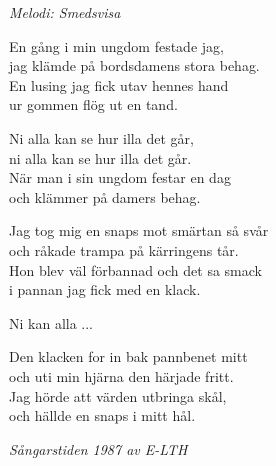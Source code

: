{\footnotesize\textit{Melodi: Smedsvisa}}\par
\vspace{10pt}
En gång i min ungdom festade jag,\\
jag klämde på bordsdamens stora behag.\\
En lusing jag fick utav hennes hand\\
ur gommen flög ut en tand.\par
\vspace{10pt}
Ni alla kan se hur illa det går,\\
ni alla kan se hur illa det går.\\
När man i sin ungdom festar en dag\\
och klämmer på damers behag.\par
\vspace{10pt}
Jag tog mig en snaps mot smärtan så svår\\
och råkade trampa på kärringens tår.\\
Hon blev väl förbannad och det sa smack\\
i pannan jag fick med en klack.\par
\vspace{10pt}
Ni kan alla ...\par
\vspace{10pt}
Den klacken for in bak pannbenet mitt\\
och uti min hjärna den härjade fritt.\\
Jag hörde att värden utbringa skål,\\
och hällde en snaps i mitt hål.
\par
\vspace{10pt}
{\footnotesize\textit{Sångarstiden 1987 av E-LTH}}
